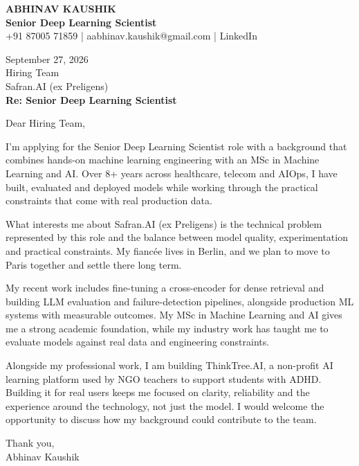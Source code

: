 \documentclass[10pt,a4paper]{article}
\begin{document}
\begin{center}
{\Large\bfseries ABHINAV KAUSHIK}\\[2pt]
{\bfseries Senior Deep Learning Scientist}\\[2pt]
+91 87005 71859 \quad | \quad aabhinav.kaushik@gmail.com \quad | \quad LinkedIn
\end{center}
\vspace{8pt}
September 27, 2026\\[6pt]
Hiring Team\\
Safran.AI (ex Preligens)\\[4pt]
\textbf{Re: Senior Deep Learning Scientist}

Dear Hiring Team,

I’m applying for the Senior Deep Learning Scientist role with a background that combines hands-on machine learning engineering with an MSc in Machine Learning and AI. Over 8+ years across healthcare, telecom and AIOps, I have built, evaluated and deployed models while working through the practical constraints that come with real production data.

What interests me about Safran.AI (ex Preligens) is the technical problem represented by this role and the balance between model quality, experimentation and practical constraints. My fiancée lives in Berlin, and we plan to move to Paris together and settle there long term.

My recent work includes fine-tuning a cross-encoder for dense retrieval and building LLM evaluation and failure-detection pipelines, alongside production ML systems with measurable outcomes. My MSc in Machine Learning and AI gives me a strong academic foundation, while my industry work has taught me to evaluate models against real data and engineering constraints.

Alongside my professional work, I am building ThinkTree.AI, a non-profit AI learning platform used by NGO teachers to support students with ADHD. Building it for real users keeps me focused on clarity, reliability and the experience around the technology, not just the model. I would welcome the opportunity to discuss how my background could contribute to the team.

Thank you,\\
Abhinav Kaushik
\end{document}
